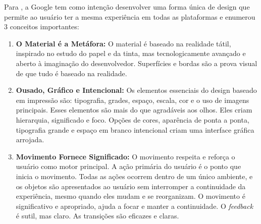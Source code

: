 Para , a Google tem como intenção desenvolver uma forma única de design que permite ao usuário ter a mesma experiência em todas as plataformas e enumerou 3 conceitos importantes:

\begin{enumerate}
    \item \textbf{O Material é a Metáfora:} O material é baseado na realidade tátil, inspirado no estudo do papel e da tinta, mas tecnologicamente avançado e aberto à imaginação do desenvolvedor. Superfícies e bordas são a prova visual de que tudo é baseado na realidade.
    \item \textbf{Ousado, Gráfico e Intencional:} Os elementos essenciais do design baseado em impressão são: tipografia, grades, espaço, escala, cor e o uso de imagens principais. Esses elementos são mais do que agradáveis aos olhos. Eles criam hierarquia, significado e foco. Opções de cores, aparência de ponta a ponta, tipografia grande e espaço em branco intencional criam uma interface gráfica arrojada.
    \item \textbf{Movimento Fornece Significado:} O movimento respeita e reforça o usuário como motor principal. A ação primária do usuário é o ponto que inicia o movimento. Todas as ações ocorrem dentro de um único ambiente, e os objetos são apresentados ao usuário sem interromper a continuidade da experiência, mesmo quando eles mudam e se reorganizam. O movimento é significativo e apropriado, ajuda a focar e manter a continuidade. O \textit{feedback} é sutil, mas claro. As transições são eficazes e claras.
\end{enumerate}